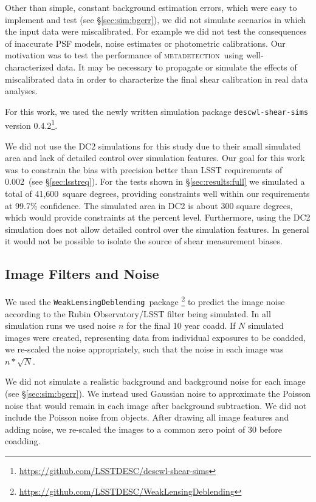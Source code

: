 \documentclass[twocolumn,twocolappendix,astrosym]{openjournal}
\newcommand{\descwl}{\texttt{WeakLensingDeblending}}
\newcommand{\mdet}{\textsc{metadetection}}
\newcommand{\mthresh}{0.002}
\newcommand{\fullarea}{41,600}
\begin{document}
Other than simple, constant background estimation errors, which were easy to
implement and test (see \S \ref{sec:sim:bgerr}), we did not simulate scenarios
in which the input data were miscalibrated.  For example we did not test the
consequences of inaccurate PSF models, noise estimates or photometric
calibrations.  Our motivation was to test the performance of \mdet\ using
well-characterized data. It may be necessary to propagate or simulate the
effects of miscalibrated data in order to characterize the final shear
calibration in real data analyses.

For this work, we used the newly written simulation package
\texttt{descwl-shear-sims} version
0.4.2\footnote{\url{https://github.com/LSSTDESC/descwl-shear-sims}}.

We did not use the DC2 simulations \citep{DC2Abolfathi2021} for this study due
to their small simulated area and lack of detailed control over simulation
features.  Our goal for this work was to constrain the bias with precision
better than LSST requirements of \mthresh\ (see \S \ref{sec:lsstreq}).  For the tests
shown in \S \ref{sec:results:full} we simulated a total of \fullarea\ square
degrees, providing constraints well within our requirements at 99.7\%
confidence. The simulated area in DC2 is about 300 square degrees, which would
provide constraints at the percent level.  Furthermore, using the DC2
simulation does not allow detailed control over the simulation features.  In
general it would not be possible to isolate the source of shear measurement
biases.

\subsection{Image Filters and Noise} \label{sec:sim:noise}

We used the \descwl\ package
\citep{DESCWLSanchez2021}\footnote{\url{https://github.com/LSSTDESC/WeakLensingDeblending}}
to predict the image noise according to the Rubin Observatory/LSST filter being
simulated.  In all simulation runs we used noise $n$ for the final 10 year
coadd.  If $N$ simulated images were created, representing data from individual
exposures to be coadded, we re-scaled the noise appropriately, such that the
noise in each image was $n * \sqrt{N}$.

We did not simulate a realistic background and background noise for each image
(see \S \ref{sec:sim:bgerr}).  We instead used Gaussian noise to approximate
the Poisson noise that would remain in each image after background subtraction.
We did not include the Poisson noise from objects.  After drawing all image
features and adding noise, we re-scaled the images to a common zero point of
30 before coadding.
\end{document}
